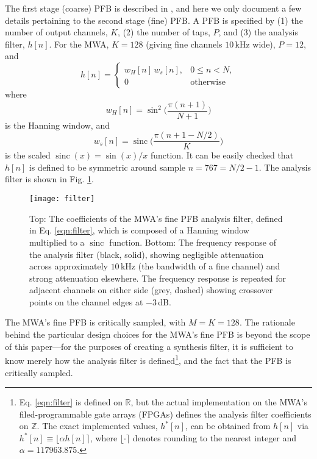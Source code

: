 \documentclass{pasa}%
\DeclareMathOperator{\sinc}{sinc}
\begin{document}
The first stage (coarse) PFB is described in \citet{Prabu2015}, and here we only document a few details pertaining to the second stage (fine) PFB.
A PFB is specified by (1) the number of output channels, $K$, (2) the number of taps, $P$, and (3) the analysis filter, $h[n]$.
For the MWA, $K = 128$ (giving fine channels $10\,$kHz wide), $P = 12$, and
\begin{equation}
    h[n] =
        \begin{cases}
            w_H[n]\,w_s[n], & 0 \le n < N, \\
            0               & \text{otherwise}
        \end{cases}
    \label{eqn:filter}
\end{equation}
where
\begin{equation*}
    w_H[n] = \sin^2\bigg(\frac{\pi (n+1)}{N+1}\bigg)
\end{equation*}
is the Hanning window, and
\begin{equation*}
    w_s[n] = \sinc\bigg(\frac{\pi(n + 1 - N/2)}{K}\bigg)
\end{equation*}
is the scaled $\sinc(x) = \sin(x)/x$ function.
It can be easily checked that $h[n]$ is defined to be symmetric around sample $n = 767 = N/2-1$.
The analysis filter is shown in Fig. \ref{fig:filter}.
\begin{figure}[t]
    \centering
    \texttt{[image: filter]}
    \caption{Top: The coefficients of the MWA's fine PFB analysis filter, defined in Eq. \eqref{eqn:filter}, which is composed of a Hanning window multiplied to a $\sinc$ function. Bottom: The frequency response of the analysis filter (black, solid), showing negligible attenuation across approximately $10\,$kHz (the bandwidth of a fine channel) and strong attenuation elsewhere. The frequency response is repeated for adjacent channels on either side (grey, dashed) showing crossover points on the channel edges at $-3\,$dB.}
    \label{fig:filter}
\end{figure}
The MWA's fine PFB is critically sampled, with $M = K = 128$.
The rationale behind the particular design choices for the MWA's fine PFB is beyond the scope of this paper---for the purposes of creating a synthesis filter, it is sufficient to know merely how the analysis filter is defined\footnote{Eq. \eqref{eqn:filter} is defined on $\mathbb{R}$, but the actual implementation on the MWA's filed-programmable gate arrays (FPGAs) defines the analysis filter coefficients on $\mathbb{Z}$. The exact implemented values, $h^\ast[n]$, can be obtained from $h[n]$ via $h^\ast[n] \equiv \lfloor\alpha h[n]\rceil$, where $\lfloor\cdot\rceil$ denotes rounding to the nearest integer and $\alpha = 117963.875$.}, and the fact that the PFB is critically sampled.
\end{document}
